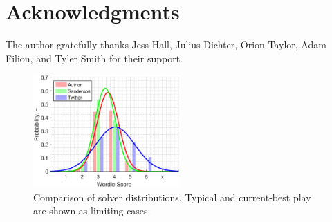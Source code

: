 \documentclass[twocolumn]{tudelft-aiaa}
\begin{document}
\section{Acknowledgments}

The author gratefully thanks Jess Hall, Julius Dichter, Orion Taylor, Adam Filion, and Tyler Smith for their support.

\begin{figure}[h!]
  \centering
    \includegraphics[width=0.5\textwidth]{performance_comparison.eps}
  \caption{Comparison of solver distributions. \rm Typical and current-best play are shown as limiting cases.}
\label{performance_comparison}
\end{figure}



\raggedright


\end{document}
